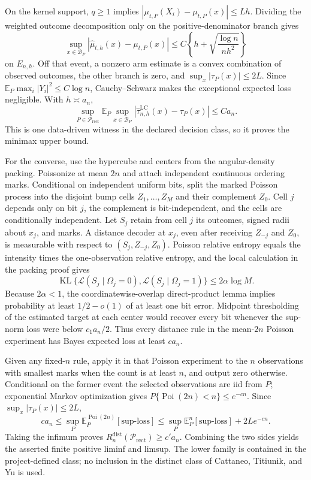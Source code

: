 On the kernel support, \(q\geq1\) implies
\(|\mu_{t,P}(X_i)-\mu_{t,P}(x)|\leq Lh\).  Dividing the weighted outcome decomposition only on the positive-denominator branch gives
\[
 \sup_{x\in\mathcal B_P}|\widehat\mu_{t,h}(x)-\mu_{t,P}(x)|
 \leq C\left\{h+\sqrt{\frac{\log n}{nh^2}}\right\}
\]
on \(E_{n,h}\).  Off that event, a nonzero arm estimate is a convex combination of observed outcomes, the other branch is zero, and \(\sup_x|\tau_P(x)|\leq2L\).  Since \(\mathbb E_P\max_i|Y_i|^2\leq C\log n\), Cauchy--Schwarz makes the exceptional expected loss negligible.  With \(h\asymp a_n\),
\[
 \sup_{P\in\mathcal P_{\mathrm{rect}}}\mathbb E_P\sup_{x\in\mathcal B_P}
 |\widehat\tau^{\mathrm{LC}}_{n,h}(x)-\tau_P(x)|
 \leq Ca_n.
\]
This is one data-driven witness in the declared decision class, so it proves the minimax upper bound.

For the converse, use the hypercube and centers from the angular-density packing.  Poissonize at mean \(2n\) and attach independent continuous ordering marks.  Conditional on independent uniform bits, split the marked Poisson process into the disjoint bump cells \(Z_1,\ldots,Z_M\) and their complement \(Z_0\).  Cell \(j\) depends only on bit \(j\), the complement is bit-independent, and the cells are conditionally independent.  Let \(S_j\) retain from cell \(j\) its outcomes, signed radii about \(x_j\), and marks.  A distance decoder at \(x_j\), even after receiving \(Z_{-j}\) and \(Z_0\), is measurable with respect to \((S_j,Z_{-j},Z_0)\).  Poisson relative entropy equals the intensity times the one-observation relative entropy, and the local calculation in the packing proof gives
\[
 \operatorname{KL}\{\mathcal L(S_j\mid\Omega_j=0),
 \mathcal L(S_j\mid\Omega_j=1)\}
 \leq2\alpha\log M.
\]
Because \(2\alpha<1\), the coordinatewise-overlap direct-product lemma implies probability at least \(1/2-o(1)\) of at least one bit error.  Midpoint thresholding of the estimated target at each center would recover every bit whenever the sup-norm loss were below \(c_1a_n/2\).  Thus every distance rule in the mean-\(2n\) Poisson experiment has Bayes expected loss at least \(ca_n\).

Given any fixed-\(n\) rule, apply it in that Poisson experiment to the \(n\) observations with smallest marks when the count is at least \(n\), and output zero otherwise.  Conditional on the former event the selected observations are iid from \(P\); exponential Markov optimization gives \(P\{\operatorname{Poi}(2n)<n\}\leq e^{-cn}\).  Since \(\sup_x|\tau_P(x)|\leq2L\),
\[
 ca_n\leq\sup_P\mathbb E_P^{\operatorname{Poi}(2n)}[\text{sup-loss}]
 \leq\sup_P\mathbb E_P^n[\text{sup-loss}]+2Le^{-cn}.
\]
Taking the infimum proves \(R_n^{\mathrm{dist}}(\mathcal P_{\mathrm{rect}})\geq c'a_n\).  Combining the two sides yields the asserted finite positive liminf and limsup.  The lower family is contained in the project-defined class; no inclusion in the distinct class of Cattaneo, Titiunik, and Yu is used.